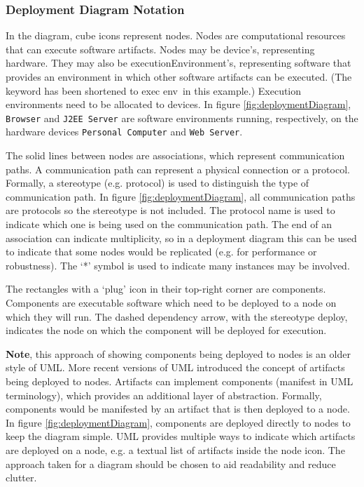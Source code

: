 \subsubsection{Deployment Diagram Notation}\label{sec:deploymentNotation}
In the diagram, cube icons represent nodes. Nodes are computational resources that can execute software artifacts.
Nodes may be \guillemotleft device\guillemotright's, representing hardware.
They may also be \guillemotleft executionEnvironment\guillemotright's, representing software that provides an environment in which other software artifacts can be executed.
(The keyword has been shortened to \guillemotleft exec env\guillemotright~in this example.)
Execution environments need to be allocated to devices.
In figure \ref{fig:deploymentDiagram}, \texttt{Browser} and \texttt{J2EE Server} are software environments running,
respectively, on the hardware devices \texttt{Personal Computer} and \texttt{Web Server}.

The solid lines between nodes are associations, which represent communication paths.
A communication path can represent a physical connection or a protocol.
Formally, a stereotype (e.g. \guillemotleft protocol\guillemotright) is used to distinguish the type of communication path.
In figure \ref{fig:deploymentDiagram}, all communication paths are protocols so the stereotype is not included.
The protocol name is used to indicate which one is being used on the communication path.
The end of an association can indicate multiplicity, so in a deployment diagram this can be used to indicate that some nodes would be replicated
(e.g. for performance or robustness). The `*' symbol is used to indicate many instances may be involved.

The rectangles with a `plug' icon in their top-right corner are components.
Components are executable software which need to be deployed to a node on which they will run.
The dashed dependency arrow, with the stereotype \guillemotleft deploy\guillemotright, indicates the node on which the component will be deployed for execution.

\textbf{Note}, this approach of showing components being deployed to nodes is an older style of UML.
More recent versions of UML introduced the concept of artifacts being deployed to nodes.
Artifacts can implement components (manifest in UML terminology), which provides an additional layer of abstraction.
Formally, components would be manifested by an artifact that is then deployed to a node.
In figure \ref{fig:deploymentDiagram}, components are deployed directly to nodes to keep the diagram simple.
UML provides multiple ways to indicate which artifacts are deployed on a node, e.g. a textual list of artifacts inside the node icon.
The approach taken for a diagram should be chosen to aid readability and reduce clutter.


